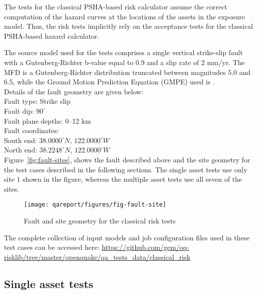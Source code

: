 The tests for the classical PSHA-based risk calculator assume the correct computation of the hazard curves at the locations of the assets in the exposure model. Thus, the risk tests implicitly rely on the acceptance tests for the classical PSHA-based hazard calculator.

The source model used for the tests comprises a single vertical strike-slip fault with a Gutenberg-Richter b-value equal to 0.9 and a slip rate of 2 mm/yr. The MFD is a Gutenberg-Richter distribution truncated between magnitudes 5.0 and 6.5, while the Ground Motion Prediction Equation (GMPE) used is \citet{boore2008}.\\

\noindent Details of the fault geometry are given below:\\

\noindent
Fault type: Strike slip\\
Fault dip: $90^{\circ}$\\
Fault plane depths: 0--12 km\\
Fault coordinates:\\
South end: $38.0000^{\circ} N$, $122.0000^{\circ} W$\\
North end: $38.2248^{\circ} N$, $122.0000^{\circ} W$\\

Figure~\ref{fig:fault-sites}, shows the fault described above and the site geometry for the test cases described in the following sections. The single asset tests use only site $1$ shown in the figure, whereas the multiple asset tests use all seven of the sites.

\begin{figure}[htbp]
\centering
\texttt{[image: qareport/figures/fig-fault-site]}
\caption{Fault and site geometry for the classical risk tests}
\label{fig:fault-site}
\end{figure}

The complete collection of input models and job configuration files used in these test cases can be accessed here:
\href{https://github.com/gem/oq-risklib/tree/master/openquake/qa_tests_data/classical_risk}
{https://github.com/gem/oq-risklib/tree/master/openquake/qa\_tests\_data/classical\_risk}

\subsection{Single asset tests}
\label{subsec:acc-cr-single}


